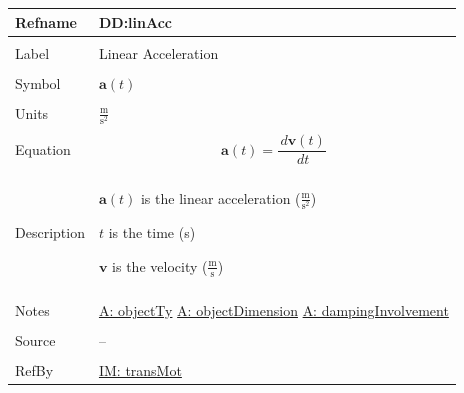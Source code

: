 \documentclass[12pt]{article}
\begin{document}
\noindent \begin{minipage}{\textwidth}
          \begin{tabular}{>{\raggedright}p{}>{\raggedright\arraybackslash}p{}}
          \toprule \textbf{Refname} & \textbf{DD:linAcc}
          \label{DD:linAcc}
          \\ \midrule \\
          Label & Linear Acceleration
          \\ \midrule \\
          Symbol & $\mathbf{a}(t)$
          \\ \midrule \\
          Units & $\frac{\text{m}}{\text{s}^{2}}$
          \\ \midrule \\
          Equation & \begin{displaymath}
                     \mathbf{a}(t)=\frac{\,d\mathbf{v}\left(t\right)}{\,dt}
                     \end{displaymath}
          \\ \midrule \\
          Description & \begin{symbDescription}
                        \item{$\mathbf{a}(t)$ is the linear acceleration ($\frac{\text{m}}{\text{s}^{2}}$)}
                        \item{$t$ is the time (s)}
                        \item{$\mathbf{v}$ is the velocity ($\frac{\text{m}}{\text{s}}$)}
                        \end{symbDescription}
          \\ \midrule \\
          Notes & \hyperref[assumpOT]{A: objectTy}
                  \hyperref[assumpOD]{A: objectDimension}
                  \hyperref[assumpDI]{A: dampingInvolvement}
          \\ \midrule \\
          Source & --
          \\ \midrule \\
          RefBy & \hyperref[IM:transMot]{IM: transMot}
          \\ \bottomrule
          \end{tabular}
          \end{minipage}
\par~
\end{document}
